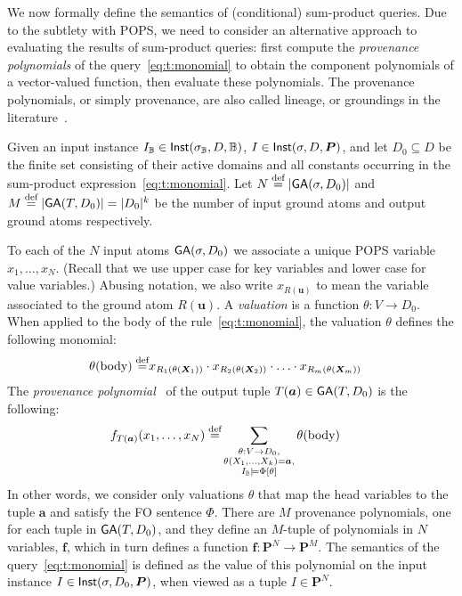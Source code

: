 We now formally define the semantics of (conditional) sum-product queries.
Due to the subtlety with POPS, we need to consider an alternative approach to evaluating
the results of sum-product queries: first compute the {\em provenance polynomials} of
the query~\eqref{eq:t:monomial} to obtain the component polynomials of a vector-valued
function, then evaluate these polynomials.  The provenance polynomials, or simply
provenance, are also called lineage, or groundings in the literature~\cite{DBLP:conf/pods/GreenKT07}.


Given an input instance $I_\mathbb B \in \textsf{Inst}(\sigma_\mathbb B, D, \mathbb B)$,
$I \in \textsf{Inst}(\sigma, D, \bm P)$, and let $D_0 \subseteq D$ be the
finite set consisting of their active domains and all constants
occurring in the sum-product expression~\eqref{eq:t:monomial}.  Let
$N \stackrel{\text{def}}{=} |\textsf{GA}(\sigma, D_0)|$ and
$M \stackrel{\text{def}}{=} |\textsf{GA}(T,D_0)| = |D_0|^k$ be the number of input ground
atoms and output ground atoms respectively.

To each of the $N$ input atoms $\textsf{GA}(\sigma,D_0)$ we associate a unique POPS variable
$x_1, \ldots, x_N$. (Recall that we use upper case for key variables and
lower case for value variables.)
Abusing notation, we also write $x_{R(\bm u)}$ to mean the variable associated to the ground
atom $R(\bm u)$.
A {\em valuation} is a function $\theta : V \rightarrow D_0$.
When applied to the body of the rule~\eqref{eq:t:monomial}, the valuation $\theta$ defines the
following monomial:
%
\begin{align}
  \theta(\text{body}) \stackrel{\text{def}}{=} & x_{R_1(\theta(\bm X_1))}\cdot x_{R_2(\theta(\bm X_2))} \cdot \ldots \cdot x_{R_m(\theta(\bm X_m))} \label{eq:grounding:monomial}
\end{align}
%
The {\em provenance polynomial}~\cite{DBLP:conf/pods/GreenKT07} of the output tuple
$T(\bm a) \in \textsf{GA}(T,D_0)$ is the following:
%
\begin{align}
  f_{T(\bm a)}(x_1, \ldots, x_N) \stackrel{\text{def}}{=} &
  \sum_{\substack{\theta: V \rightarrow D_0, \\ \theta(X_1,\ldots,X_k)=\bm a, \\ I_\mathbb B \models
  \Phi[\theta]}} \theta(\text{body}) \label{eq:grounding:polynomial}
\end{align}
%
In other words, we consider only valuations $\theta$ that map the head
variables to the tuple $\bm a$ and satisfy the FO sentence $\Phi$.
There are $M$ provenance polynomials, one for each tuple in
$\textsf{GA}(T,D_0)$, and they define an $M$-tuple of polynomials in $N$
variables, $\bm f$, which in turn defines a function
$\bm f : \bm P^N \rightarrow \bm P^M$.  The semantics of the
query~\eqref{eq:t:monomial} is defined as the value of this polynomial
on the input instance $I \in \textsf{Inst}(\sigma, D_0, \bm P)$, when viewed
as a tuple $I \in \bm P^N$.

